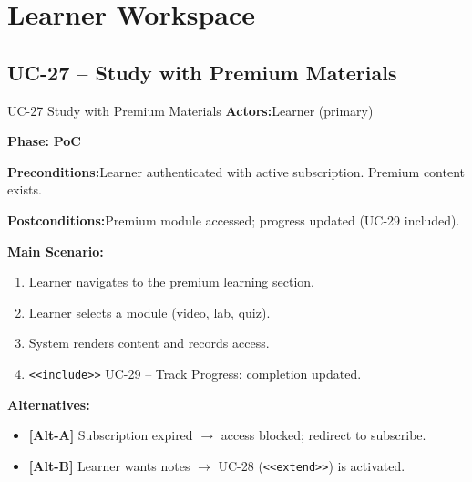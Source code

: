\documentclass[12pt,a4paper]{report}
\newcommand{\ucfield}[2]{%
    \noindent\textbf{\color{helixpurplemid}#1:}\quad #2\par\medskip
}
\newcommand{\ucphase}[1]{%
    \noindent\textbf{\color{helixpurplemid}Phase:}\quad%
    \ifstrequal{#1}{PoC}{\textcolor{helixteal}{\textbf{PoC}}}{\textcolor{helixamber}{\textbf{Future MVP}}}%
    \par\medskip
}
\begin{document}
\chapter{Learner Workspace}

\section{UC-27 -- Study with Premium Materials}
\begin{ucbox}{UC-27 \quad Study with Premium Materials}
    \ucfield{Actors}{Learner (primary)}
    \ucphase{PoC}
    \ucfield{Preconditions}{Learner authenticated with active subscription. Premium content exists.}
    \ucfield{Postconditions}{Premium module accessed; progress updated (UC-29 included).}
    \textbf{\color{helixpurplemid}Main Scenario:}
    \begin{enumerate}
        \item Learner navigates to the premium learning section.
        \item Learner selects a module (video, lab, quiz).
        \item System renders content and records access.
        \item \texttt{<<include>>} UC-29 -- Track Progress: completion updated.
    \end{enumerate}
    \textbf{\color{helixpurplemid}Alternatives:}
    \begin{itemize}
        \item \textbf{[Alt-A]} Subscription expired $\rightarrow$ access blocked; redirect to subscribe.
        \item \textbf{[Alt-B]} Learner wants notes $\rightarrow$ UC-28 (\texttt{<<extend>>}) is activated.
    \end{itemize}
\end{ucbox}
\end{document}
